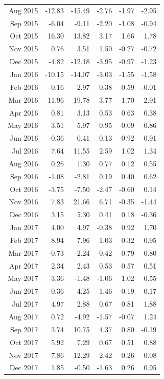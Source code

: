 \begin{tabularx}{\textwidth}{rrrrrr}
  Aug 2015 & -12.83 & -15.49 & -2.76 & -1.97 & -2.95 \\ 
  Sep 2015 & -6.04 & -9.11 & -2.20 & -1.08 & -0.94 \\ 
  Oct 2015 & 16.30 & 13.82 & 3.17 & 1.66 & 1.78 \\ 
  Nov 2015 & 0.76 & 3.51 & 1.50 & -0.27 & -0.72 \\ 
  Dec 2015 & -4.82 & -12.18 & -3.95 & -0.97 & -1.23 \\ 
  Jan 2016 & -10.15 & -14.07 & -3.03 & -1.55 & -1.58 \\ 
  Feb 2016 & -0.16 & 2.97 & 0.38 & -0.59 & -0.01 \\ 
  Mar 2016 & 11.96 & 19.78 & 3.77 & 1.70 & 2.91 \\ 
  Apr 2016 & 0.81 & 3.13 & 0.53 & 0.63 & 0.38 \\ 
  May 2016 & 3.51 & 5.97 & 0.95 & -0.09 & -0.86 \\ 
  Jun 2016 & -0.36 & 0.41 & 0.13 & -0.92 & 0.91 \\ 
  Jul 2016 & 7.64 & 11.55 & 2.59 & 1.02 & 1.34 \\ 
  Aug 2016 & 0.26 & 1.30 & 0.77 & 0.12 & 0.55 \\ 
  Sep 2016 & -1.08 & -2.81 & 0.19 & 0.40 & 0.62 \\ 
  Oct 2016 & -3.75 & -7.50 & -2.47 & -0.60 & 0.14 \\ 
  Nov 2016 & 7.83 & 21.66 & 6.71 & -0.35 & -1.44 \\ 
  Dec 2016 & 3.15 & 5.30 & 0.41 & 0.18 & -0.36 \\ 
  Jan 2017 & 4.00 & 4.97 & -0.38 & 0.92 & 1.70 \\ 
  Feb 2017 & 8.94 & 7.96 & 1.03 & 0.32 & 0.95 \\ 
  Mar 2017 & -0.73 & -2.24 & -0.42 & 0.79 & 0.80 \\ 
  Apr 2017 & 2.34 & 2.43 & 0.53 & 0.57 & 0.51 \\ 
  May 2017 & 3.36 & -1.48 & -1.06 & 1.02 & 0.55 \\ 
  Jun 2017 & 0.36 & 4.25 & 1.46 & -0.19 & 0.17 \\ 
  Jul 2017 & 4.97 & 2.88 & 0.67 & 0.81 & 1.88 \\ 
  Aug 2017 & 0.72 & -4.92 & -1.57 & -0.07 & 1.24 \\ 
  Sep 2017 & 3.74 & 10.75 & 4.37 & 0.80 & -0.19 \\ 
  Oct 2017 & 5.92 & 7.29 & 0.67 & 0.51 & 0.88 \\ 
  Nov 2017 & 7.86 & 12.29 & 2.42 & 0.26 & 0.08 \\ 
  Dec 2017 & 1.85 & -0.50 & -1.63 & 0.26 & 0.95 \\ 

\end{tabularx}
